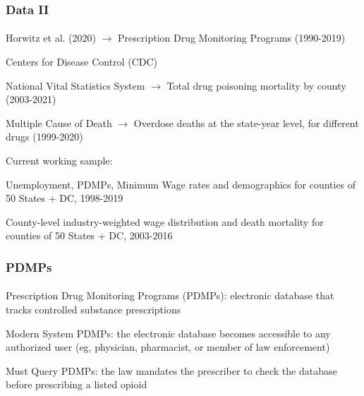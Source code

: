 \begin{frame}

    \frametitle{Data II} %
    \framesubtitle{}  %
    \rmfamily %

    \begin{wideitemize}
        \item \textcolor{fgre}{Horwitz et al. (2020)} \(\to\) Prescription Drug Monitoring Programs (1990-2019)
        \item \textcolor{fgre}{Centers for Disease Control (CDC)} 
        \vspace{9pt}
        \begin{wideitemize}
            \item[\textcolor{fgre}{\textbullet}] \textcolor{fgre}{National Vital Statistics System} \(\to\) Total drug poisoning mortality by county (2003-2021)
            \item[\textcolor{fgre}{\textbullet}] \textcolor{fgre}{Multiple Cause of Death} \(\to\) Overdose deaths at the state-year level, for different drugs (1999-2020)
        \end{wideitemize}
         
    \end{wideitemize}

    \vspace{9pt}
    Current working sample:
    \vspace{9pt}
    
    \begin{wideitemize}
        \item Unemployment, PDMPs, Minimum Wage rates and demographics for counties of 50 States + DC, 1998-2019
        \item County-level industry-weighted wage distribution and death mortality for counties of 50 States + DC, 2003-2016
    \end{wideitemize}

\end{frame}


\begin{frame}

    \frametitle{PDMPs} %
    \framesubtitle{}  %
    \rmfamily %
    
    Prescription Drug Monitoring Programs (\textcolor{fblu}{PDMPs}): electronic database that tracks controlled substance prescriptions
    \vspace{9pt}

    \begin{wideenumerate}
        \item \textcolor{fblu}{Modern System PDMPs}: the electronic database becomes accessible to any authorized user (eg, physician, pharmacist, or member of law enforcement)
        \item \textcolor{fblu}{Must Query PDMPs}: the law mandates the prescriber to check the database before prescribing a listed opioid
    \end{wideenumerate}

    

\end{frame}